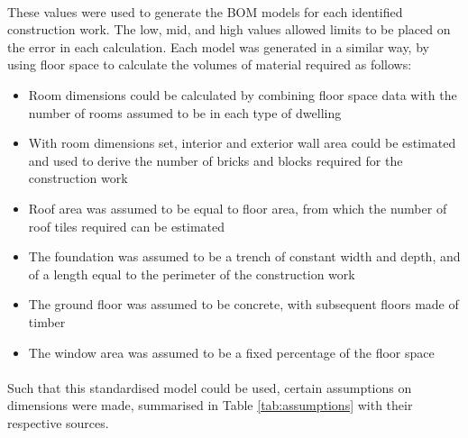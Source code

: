 \documentclass[12pt]{article}
\begin{document}
\paragraph{}
These values were used to generate the BOM models for each identified construction work. The low, mid, and high values allowed limits to be placed on the error in each calculation. Each model was generated in a similar way, by using floor space to calculate the volumes of material required as follows:

\begin{itemize}
\itemsep0em
    \item Room dimensions could be calculated by combining floor space data with the number of rooms assumed to be in each type of dwelling
	\item With room dimensions set, interior and exterior wall area could be estimated and used to derive the number of bricks and blocks required for the construction work
	\item Roof area was assumed to be equal to floor area, from which the number of roof tiles required can be estimated
	\item The foundation was assumed to be a trench of constant width and depth, and of a length equal to the perimeter of the construction work
	\item The ground floor was assumed to be concrete, with subsequent floors made of timber
	\item The window area was assumed to be a fixed percentage of the floor space
\end{itemize}
	
\paragraph{}
Such that this standardised model could be used, certain assumptions on dimensions were made, summarised in Table \ref{tab:assumptions} with their respective sources. 
\end{document}
